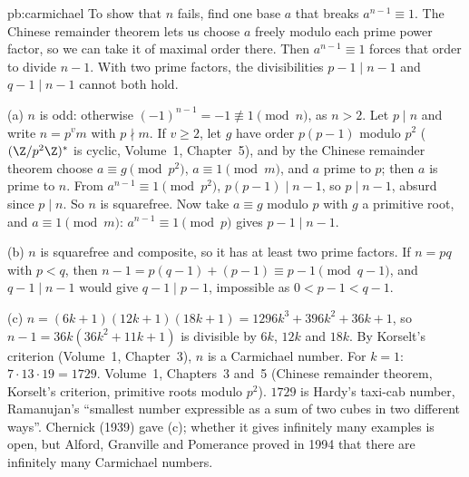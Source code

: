 \begin{solution}{pb:carmichael}
\idea To show that $n$ fails, find one base $a$ that breaks $a^{n-1}\equiv1$. The Chinese remainder theorem lets us choose
$a$ freely modulo each prime power factor, so we can take it of maximal order there. Then $a^{n-1}\equiv1$ forces that order
to divide $n-1$. With two prime factors, the divisibilities $p-1\mid n-1$ and $q-1\mid n-1$ cannot both hold.

\writeup (a) $n$ is odd: otherwise $(-1)^{n-1}=-1\not\equiv1\pmod n$, as $n>2$. Let $p\mid n$ and write $n=p^vm$ with $p\nmid m$.
If $v\ge2$, let $g$ have order $p(p-1)$ modulo $p^2$ ($(\Z/p^2\Z)^*$ is cyclic, Volume~1, Chapter~5), and by the Chinese
remainder theorem choose $a\equiv g\pmod{p^2}$, $a\equiv1\pmod m$, and $a$ prime to $p$; then $a$ is prime to $n$. From
$a^{n-1}\equiv1\pmod{p^2}$, $p(p-1)\mid n-1$, so $p\mid n-1$, absurd since $p\mid n$. So $n$ is squarefree. Now take $a\equiv g$
modulo $p$ with $g$ a primitive root, and $a\equiv1\pmod m$: $a^{n-1}\equiv1\pmod p$ gives $p-1\mid n-1$.

(b) $n$ is squarefree and composite, so it has at least two prime factors. If $n=pq$ with $p<q$, then
$n-1=p(q-1)+(p-1)\equiv p-1\pmod{q-1}$, and $q-1\mid n-1$ would give $q-1\mid p-1$, impossible as $0<p-1<q-1$.

(c) $n=(6k+1)(12k+1)(18k+1)=1296k^3+396k^2+36k+1$, so $n-1=36k(36k^2+11k+1)$ is divisible by $6k$, $12k$ and $18k$. By
Korselt's criterion (Volume~1, Chapter~3), $n$ is a Carmichael number. For $k=1$: $7\cdot13\cdot19=1729$.
\tools Volume~1, Chapters~3 and~5 (Chinese remainder theorem, Korselt's criterion, primitive roots modulo $p^2$).
\leads $1729$ is Hardy's taxi-cab number, Ramanujan's ``smallest number expressible as a sum of two cubes in two different
ways''. Chernick (1939) gave (c); whether it gives infinitely many examples is open, but Alford, Granville and Pomerance proved
in 1994 that there are infinitely many Carmichael numbers.
\end{solution}

